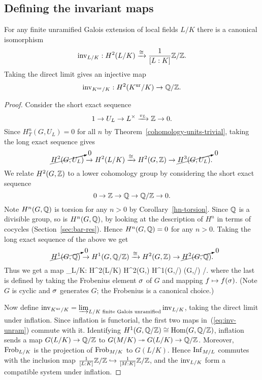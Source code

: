 \subsection{Defining the invariant maps}
\begin{pr}
For any finite unramified Galois extension of local fields $L/K$ there is a canonical isomorphism
\[
\operatorname{inv}_{L/K}:H^2(L/K)\xrightarrow{\cong} \frac{1}{[L:K]}\mathbb{Z}/\mathbb{Z}.
\]
Taking the direct limit gives an injective map
\[
\inv_{K\ur/K}:H^2(K\ur/K)%
\to\Q/\Z.
\]
\end{pr}
\begin{proof}
Consider the short exact sequence
\[
1\to U_L\to L^{\times} \xrightarrow{v_L}\mathbb{Z}\to 0.
\]
Since $H_T^n(G,U_L)=0$ for all $n$ by Theorem~\ref{cohomology-units-trivial}, taking the long exact sequence gives
\[
\cancelto{0}{H^2(G,U_L)}
\to H^2(L/K)\xrightarrow{\cong} H^2(G,\mathbb{Z}) \to \cancelto{0}{H^3(G,U_L)}.
\]
We relate $H^2(G,\mathbb{Z})$ to a lower cohomology group by considering the short exact sequence
\[
0\to \mathbb{Z}\to \mathbb{Q}\to \mathbb{Q}/\mathbb{Z}\to 0.
\]
Note $H^n(G,\mathbb{Q})$ is torsion for any $n>0$ by Corollary~\ref{hn-torsion}. Since $\mathbb{Q}$ is a divisible group, so is $H^n(G,\mathbb{Q})$, by looking at the description of $H^n$ in terms of cocycles (Section~\ref{sec:bar-res}). 
Hence 
$H^n(G,\mathbb{Q})=0$ for any $n>0$.
Taking the long exact sequence of the above we get
\[
\cancelto{0}{H^1(G,\mathbb{Q})} \to H^1(G,\mathbb{Q}/\mathbb{Z}) \xrightarrow{\cong}
H^2(G,\mathbb{Z}) \to \cancelto{0}{H^2(G,\mathbb{Q})}.
\]
Thus we get a map
\inv_{L/K}:\quad 
H^2(L/K)\xra{\cong} H^2(G,\Z) \xleftarrow{\cong} H^1(G,\Q/\Z) \stackrel{\ref{h1-is-hom}}{\cong} \Hom(G,\Q/\Z) %
\xra{\cong}\rc{[L:K]}\Z/\Z.
\eeq
where the last is defined by taking the Frobenius element $\sigma$ of $G$ and mapping $f\mapsto f(\sigma)$. (Note $G$ is cyclic and $\sigma$ generates $G$; the Frobenius is a canonical choice.)

Now define $\operatorname{inv}_{K^{\text{ur}}/K}=\varinjlim_{L/K\text{ finite Galois unramified}} \operatorname{inv}_{L/K}$, taking the direct limit under inflation. Since inflation is functorial, the first two maps in~(\ref{eq:inv-unram}) commute with it. Identifying $H^1(G,\mathbb{Q}/\mathbb{Z})\cong \operatorname{Hom}(G,\mathbb{Q}/\mathbb{Z})$, inflation sends a map $G(L/K)\to \mathbb{Q}/\mathbb{Z}$ to $G(M/K)\twoheadrightarrow G(L/K)\to \mathbb{Q}/\mathbb{Z}$. Moreover, $\operatorname{Frob}_{L/K}$ is the projection of $\operatorname{Frob}_{M/K}$ to $G(L/K)$. Hence $\operatorname{Inf}_{M/L}$ commutes with the inclusion map $\frac{1}{[L:K]}\mathbb{Z}/\mathbb{Z}\hookrightarrow \frac{1}{[M:K]}\mathbb{Z}/\mathbb{Z}$, and the $\operatorname{inv}_{L/K}$ form a compatible system under inflation.
\end{proof}
